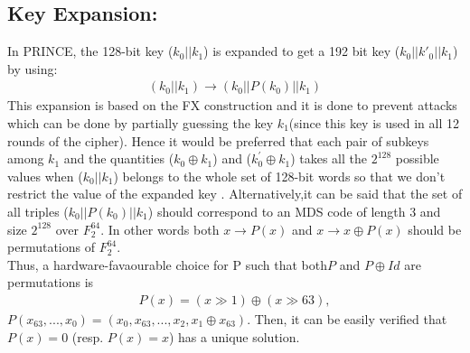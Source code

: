 \documentclass{transcrypto}
\begin{document}
\subsection{Key Expansion:}
 In PRINCE, the 128-bit key ($k_{0}||k_{1}$) is expanded to get a 192 bit key ($k_{0}||k'_{0}||k_{1}$) by using:
\begin{align*}
    (k_{0}||k_{1}) \xrightarrow{}(k_{0}||P(k_{0})||k_{1})
\end{align*}
This expansion is based on the FX construction and it is done to prevent attacks which can be done by partially guessing the key $k_1$(since this key is used in all 12 rounds of the cipher).
 Hence it would be preferred that each pair of subkeys among $k_{1}$ and the quantities ($k_{0} \oplus k_{1} $) and ($k^{'}_{0} \oplus k_{1}$) takes all the $2^{128}$ possible values when ($k_{0}||k_{1}$) belongs to the whole set of 128-bit words so that we don't restrict the value of the expanded key . Alternatively,it can be said that  the set of all triples ($k_{0}||P(k_{0})||k_{1}$) should correspond to an MDS code of length 3 and size $2^{128}$ over $F^{64}_{2}$. In other words  both $x\xrightarrow{} P(x)$ and $x \xrightarrow{} x \oplus P(x)$ should be permutations of $F^{64}_{2}$.
\\
Thus, a hardware-favaourable choice for P such that both$ P$ and $P \oplus Id$ are permutations is
\begin{align*}
    P(x) = (x \gg 1) \oplus (x \gg 63) ,
\end{align*}
$P(x_{63}, . . . , x_{0}) = (x_{0}, x_{63}, . . . , x_{2}, x_{1} \oplus x_{63})$. Then, it can be easily verified that $P(x) = 0$ (resp. $P(x) = x$) has a unique solution.
\end{document}
